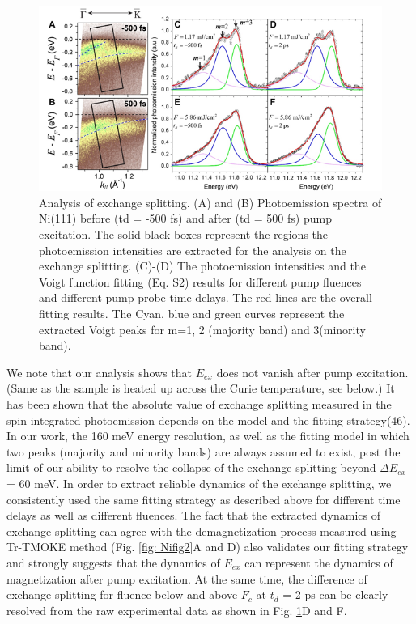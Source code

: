 \begin{figure}[htbp]
	\begin{center}
		\includegraphics[width=150mm]{figs/NiFigS4}
	\end{center}
	\caption{Analysis of exchange splitting. (A) and (B) Photoemission spectra of Ni(111) before (td = -500 fs) and after (td = 500 fs) pump excitation. The solid black boxes represent the regions the photoemission intensities are extracted for the analysis on the exchange splitting. (C)-(D) The photoemission intensities and the Voigt function fitting (Eq. S2) results for different pump fluences and different pump-probe time delays. The red lines are the overall fitting results. The Cyan, blue and green curves represent the extracted Voigt peaks for m=1, 2 (majority band) and 3(minority band).}
	\label{fig: NiSIfig4}
\end{figure}

We note that our analysis shows that $E_{ex}$ does not vanish after pump excitation. (Same as the sample is heated up across the Curie temperature, see below.) It has been shown that the absolute value of exchange splitting measured in the spin-integrated photoemission depends on the model and the fitting strategy(46). In our work, the 160 meV energy resolution, as well as the fitting model in which two peaks (majority and minority bands) are always assumed to exist, post the limit of our ability to resolve the collapse of the exchange splitting beyond $\Delta E_{ex}$ = 60 meV. In order to extract reliable dynamics of the exchange splitting, we consistently used the same fitting strategy as described above for different time delays as well as different fluences. The fact that the extracted dynamics of exchange splitting can agree with the demagnetization process measured using Tr-TMOKE method (Fig. \ref{fig: Nifig2}A and D) also validates our fitting strategy and strongly suggests that the dynamics of $E_{ex}$ can represent the dynamics of magnetization after pump excitation. At the same time, the difference of exchange splitting for fluence below and above $F_c$ at $t_d$ =  2 ps can be clearly resolved from the raw experimental data as shown in Fig. \ref{fig: NiSIfig4}D and F.

